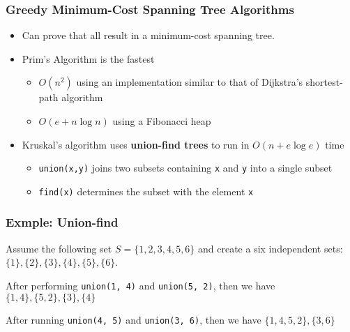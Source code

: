 \documentclass[newPxFont,sthlmFooter,nooffset]{beamer}
\begin{document}
\begin{frame}[t]
  \frametitle{Greedy Minimum-Cost Spanning Tree Algorithms}
  \begin{itemize}
  \item Can prove that all result in a minimum-cost spanning tree.
  \item Prim's Algorithm is the fastest
    \begin{itemize}
    \item $O(n^2)$ using an implementation similar to that of Dijkstra's shortest-path algorithm
    \item $O(e+n\log n)$ using a Fibonacci heap
    \end{itemize}
  \item Kruskal's algorithm uses \textbf{union-find trees} to run in $O(n+e \log e)$ time
    \begin{itemize}
    \item \texttt{union(x,y)} joins two subsets containing \texttt{x} and \texttt{y} into a single subset
    \item \texttt{find(x)} determines the subset with the element \texttt{x}
    \end{itemize}
  \end{itemize}
\end{frame}


\begin{frame}[t]
  \frametitle{Exmple: Union-find}
Assume the following set $S=\{1, 2, 3, 4, 5, 6\}$ and create a six independent sets: $\{1\}, \{2\}, \{3\}, \{4\}, \{5\}, \{6\}$.

After performing \texttt{union(1, 4)} and \texttt{union(5, 2)}, then we have $\{1, 4\}, \{5, 2\}, \{3\}, \{4\}$

After running \texttt{union(4, 5)} and \texttt{union(3, 6)}, then we have $\{1, 4, 5, 2\}, \{3, 6\}$


\begin{columns}
\end{columns}
\end{frame}

\begin{comment}
\begin{frame}[t]
  \frametitle{The code: union-find}

\end{frame}


\begin{frame}[t]
  \frametitle{}
\end{frame}
\end{comment}
\end{document}
